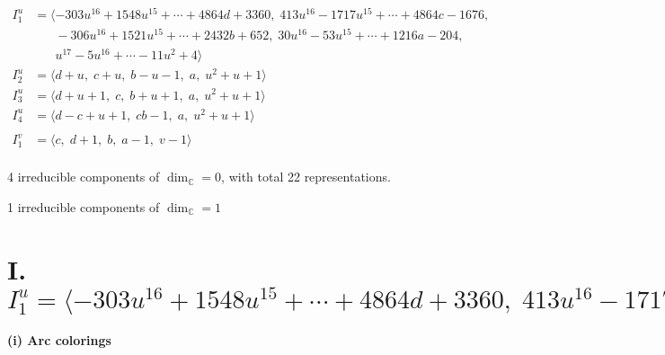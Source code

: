 \documentclass[1p]{elsarticle_modified}
\theoremstyle{definition}
\begin{document}
\begin{align*}
I^u_{1}&=\langle 
-303 u^{16}+1548 u^{15}+\cdots+4864 d+3360,\;413 u^{16}-1717 u^{15}+\cdots+4864 c-1676,\\
\phantom{I^u_{1}}&\phantom{= \langle  }-306 u^{16}+1521 u^{15}+\cdots+2432 b+652,\;30 u^{16}-53 u^{15}+\cdots+1216 a-204,\\
\phantom{I^u_{1}}&\phantom{= \langle  }u^{17}-5 u^{16}+\cdots-11 u^2+4\rangle \\
I^u_{2}&=\langle 
d+u,\;c+u,\;b- u-1,\;a,\;u^2+u+1\rangle \\
I^u_{3}&=\langle 
d+u+1,\;c,\;b+u+1,\;a,\;u^2+u+1\rangle \\
I^u_{4}&=\langle 
d- c+u+1,\;c b-1,\;a,\;u^2+u+1\rangle \\
\\
I^v_{1}&=\langle 
c,\;d+1,\;b,\;a-1,\;v-1\rangle \\
\end{align*}
\raggedright * 4 irreducible components of $\dim_{\mathbb{C}}=0$, with total 22 representations.\\
\raggedright * 1 irreducible components of $\dim_{\mathbb{C}}=1$ \\
\newpage
\renewcommand{\arraystretch}{1}
\centering \section*{I. $I^u_{1}= \langle -303 u^{16}+1548 u^{15}+\cdots+4864 d+3360,\;413 u^{16}-1717 u^{15}+\cdots+4864 c-1676,\;-306 u^{16}+1521 u^{15}+\cdots+2432 b+652,\;30 u^{16}-53 u^{15}+\cdots+1216 a-204,\;u^{17}-5 u^{16}+\cdots-11 u^2+4 \rangle$}
\flushleft \textbf{(i) Arc colorings}\\
\end{document}
